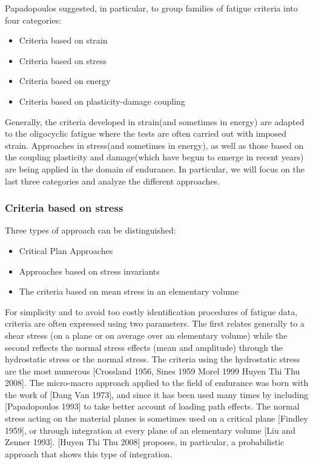 \documentclass[3p,times,procedia,number]{elsarticle}
\begin{document}
 
Papadopoulos suggested, in particular, to group families of fatigue criteria into four categories:
\begin{itemize}
\item Criteria based on strain
\item Criteria based on stress
\item Criteria based on energy
\item Criteria based on plasticity-damage coupling
\end{itemize}
Generally, the criteria developed in strain(and sometimes in energy) are adapted to the oligocyclic fatigue where the tests are often carried out with imposed strain. Approaches in stress(and sometimes in energy), as well as those based on the coupling plasticity and damage(which have begun to emerge in recent years) are being applied in the domain of endurance. In particular, we will focus on the last three categories and analyze the different approaches.

\subsubsection{Criteria based on stress}
\vspace{6pt}

Three types of approach can be distinguished:
\begin{itemize}
	\item Critical Plan Approaches
	\item Approaches based on stress invariants
	\item The criteria based on mean stress in an elementary volume
\end{itemize}
For simplicity and to avoid too costly identification procedures of fatigue data, criteria are often expressed using two
parameters. The first relates generally to a shear stress (on a plane or on average over an elementary volume) while
the second reflects the normal stress effects (mean and amplitude) through the hydrostatic stress or the normal stress.
The criteria using the hydrostatic stress are the most numerous [Crossland 1956, Sines 1959 Morel 1999 Huyen Thi
Thu 2008]. The micro-macro approach applied to the field of endurance was born with the work of [Dang Van
1973], and since it has been used many times by including [Papadopoulos 1993] to take better account of loading path effects. The normal stress acting on the material planes is sometimes used on a critical plane [Findley 1959], or
through integration at every plane of an elementary volume [Liu and Zenner 1993]. [Huyen Thi Thu 2008] proposes, in
particular, a probabilistic approach that shows this type of integration.
\end{document}
